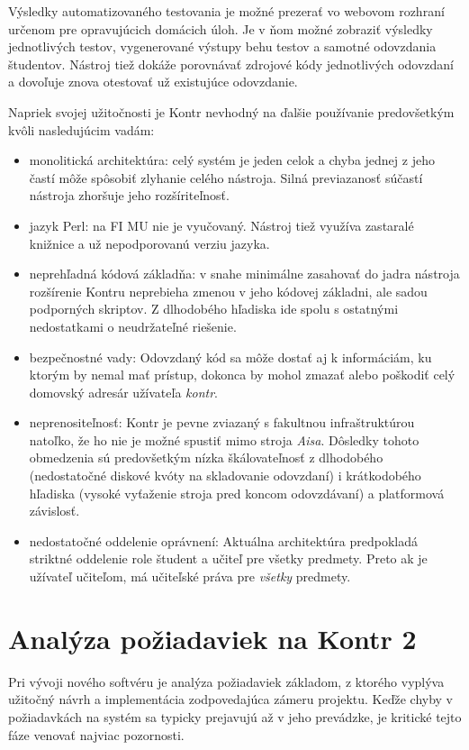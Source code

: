 \documentclass[
  digital, %
  twoside, %
  table,   %
  lof,     %
  lot,     %
]{fithesis3}
\begin{document}
Výsledky automatizovaného testovania je možné prezerať vo webovom rozhraní určenom pre opravujúcich domácich úloh. Je v ňom možné zobraziť výsledky jednotlivých testov, vygenerované výstupy behu testov a samotné odovzdania študentov. Nástroj tiež dokáže porovnávať zdrojové kódy jednotlivých odovzdaní a dovoľuje znova otestovať už existujúce odovzdanie. 

Napriek svojej užitočnosti je Kontr nevhodný na ďalšie používanie predovšetkým kvôli nasledujúcim vadám:
\begin{itemize}
    \item monolitická architektúra: celý systém je jeden celok a chyba jednej z jeho častí môže spôsobiť zlyhanie celého nástroja. Silná previazanosť súčastí nástroja zhoršuje jeho rozšíriteľnosť.
    \item jazyk Perl: na FI MU nie je vyučovaný. Nástroj tiež využíva zastaralé knižnice a už nepodporovanú verziu jazyka. 
    \item neprehľadná kódová základňa: v snahe minimálne zasahovať do jadra nástroja rozšírenie Kontru neprebieha zmenou v jeho kódovej základni, ale sadou podporných skriptov. Z dlhodobého hľadiska ide spolu s ostatnými nedostatkami o neudržateľné riešenie.
    \item bezpečnostné vady: Odovzdaný kód sa môže dostať aj k informáciám, ku ktorým by nemal mať prístup, dokonca by mohol zmazať alebo poškodiť celý domovský adresár užívateľa \textit{kontr}.
    \item neprenositeľnosť: Kontr je pevne zviazaný s fakultnou infraštruktúrou natoľko, že ho nie je možné spustiť mimo stroja \textit{Aisa}. Dôsledky tohoto obmedzenia sú predovšetkým nízka škálovateľnosť z dlhodobého (nedostatočné diskové kvóty na skladovanie odovzdaní) i krátkodobého hľadiska (vysoké vyťaženie stroja pred koncom odovzdávaní) a platformová závislosť.
    \item nedostatočné oddelenie oprávnení: Aktuálna architektúra predpokladá striktné oddelenie role študent a učiteľ pre všetky predmety. Preto ak je užívateľ učiteľom, má učiteľské práva pre \emph{všetky} predmety.
\end{itemize}

\chapter{Analýza požiadaviek na Kontr 2}

Pri vývoji nového softvéru je analýza požiadaviek základom, z ktorého vyplýva užitočný návrh a implementácia zodpovedajúca zámeru projektu. Keďže chyby v požiadavkách na systém sa typicky prejavujú až v jeho prevádzke, je kritické tejto fáze venovať najviac pozornosti. 
\end{document}
